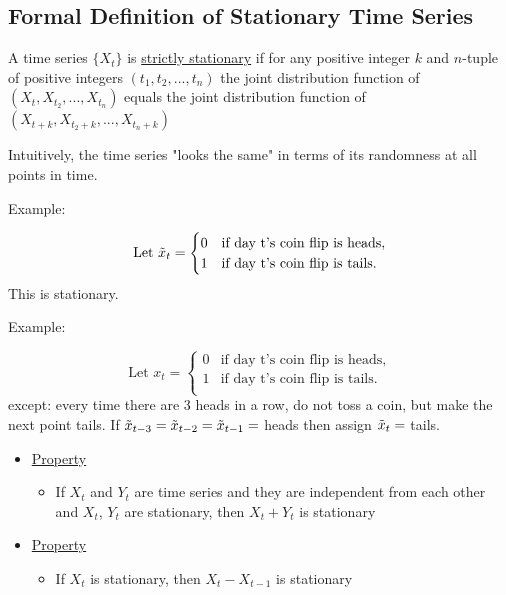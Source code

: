 \subsection{Formal Definition of Stationary Time Series}

\begin{mdframed}
A time series $\{X_t\}$ is \underline{strictly stationary} if for any positive integer $k$ and $n$-tuple of positive integers $(t_1,t_2,...,t_n)$ the joint distribution function of $(X_t, X_{t_2},...,X_{t_n})$ equals the joint distribution function of $(X_{t+k}, X_{t_2+k}, ..., X_{t_n+k})$
\end{mdframed}
Intuitively, the time series "looks the same" in terms of its randomness at all points in time.

Example:

\[ \text{Let }\Tilde{x}_t = 
\begin{cases} 
0 & \text{if day t's coin flip is heads}, \\
1 & \text{if day t's coin flip is tails}.
\end{cases}
\]
This is stationary.

Example:

\[ \text{Let }x_t = 
\begin{cases} 
0 & \text{if day t's coin flip is heads}, \\
1 & \text{if day t's coin flip is tails}. \\
\end{cases}
\]
except: \quad every time there are 3 heads in a row, do not toss a coin, but make the next point tails. If $\Tilde{x}_{t-3}=\Tilde{x}_{t-2}=\Tilde{x}_{t-1}=$ heads then assign $\Tilde{x}_t=$ tails.

\begin{itemize}
    \item[] \underline{Property}
    \begin{itemize}
        \item[] If $X_t$ and $Y_t$ are time series and they are independent from each other and $X_t$, $Y_t$ are stationary, then $X_t + Y_t$ is stationary
    \end{itemize}
    \item \underline{Property}
        \begin{itemize}
            \item[] If $X_t$ is stationary, then $X_t - X_{t-1}$ is stationary
        \end{itemize}
\end{itemize}

